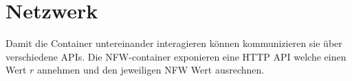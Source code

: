 \section{Netzwerk}

Damit die Container untereinander interagieren können kommunizieren sie über
verschiedene APIs. Die NFW-container exponieren eine HTTP API welche einen Wert
\( r \) annehmen und den jeweiligen NFW Wert ausrechnen.
